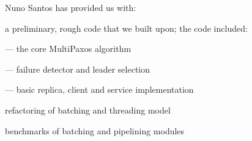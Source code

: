\noindent Nuno Santos has provided us with:
\begin{tightList}
  \item[\textbullet] a preliminary, rough code that we built upon; the code included:
  \begin{tightList}
    \item[---] the core MultiPaxos algorithm
    \item[---] failure detector and leader selection
    \item[---] basic replica, client and service implementation
  \end{tightList}
  \item[\textbullet] refactoring of batching and threading model
  \item[\textbullet] benchmarks of batching and pipelining modules
\end{tightList}

